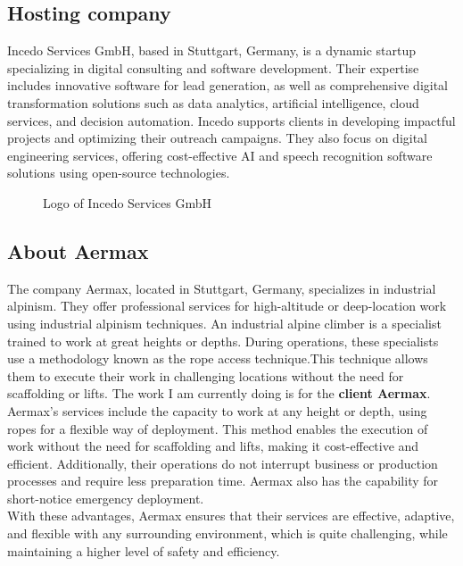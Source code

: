 \subsection{Hosting company}
Incedo Services GmbH, based in Stuttgart, Germany, is a dynamic startup specializing in digital consulting and software development. Their expertise includes innovative software for lead generation, as well as comprehensive digital transformation solutions such as data analytics, artificial intelligence, cloud services, and decision automation. Incedo supports clients in developing impactful projects and optimizing their outreach campaigns. They also focus on digital engineering services, offering cost-effective AI and speech recognition software solutions using open-source technologies. \cite{about-incedo}
\begin{figure}[H]
    \centering
    \caption{Logo of Incedo Services GmbH}
    \label{fig:logo-of-incedo}
\end{figure}

\subsection{About Aermax}
The company Aermax, located in Stuttgart, Germany, specializes in industrial alpinism. They offer professional services for high-altitude or deep-location work using industrial alpinism techniques. An industrial alpine climber is a specialist trained to work at great heights or depths. During operations, these specialists use a methodology known as the rope access technique.This technique allows them to execute their work in challenging locations without the need for scaffolding or lifts. The work I am currently doing is for the \textbf{client Aermax}.\\
Aermax's services include the capacity to work at any height or depth, using ropes for a flexible way of deployment. This method enables the execution of work without the need for scaffolding and lifts, making it cost-effective and efficient. Additionally, their operations do not interrupt business or production processes and require less preparation time. Aermax also has the capability for short-notice emergency deployment.\\
With these advantages, Aermax ensures that their services are effective, adaptive, and flexible with any surrounding environment, which is quite challenging, while maintaining a higher level of safety and efficiency.
